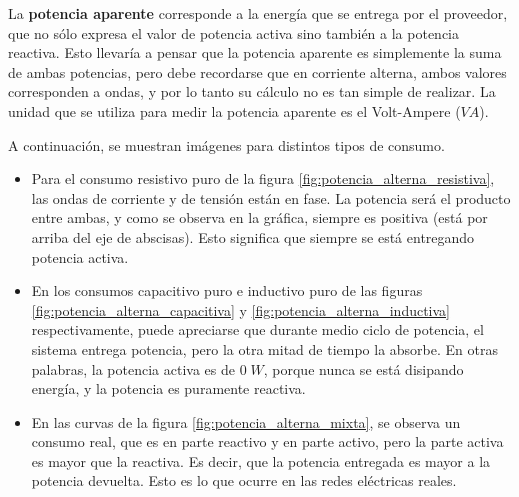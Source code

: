La \textbf{potencia aparente} corresponde a la energía que se entrega por el proveedor, que no sólo expresa el valor de potencia activa sino también a la potencia reactiva. Esto llevaría a pensar que la potencia aparente es simplemente la suma de ambas potencias, pero debe recordarse que en corriente alterna, ambos valores corresponden a ondas, y por lo tanto su cálculo no es tan simple de realizar. La unidad que se utiliza para medir la potencia aparente es el Volt-Ampere ($VA$).

A continuación, se muestran imágenes para distintos tipos de consumo.
\begin{itemize}
	\item Para el consumo resistivo puro de la figura \ref{fig:potencia_alterna_resistiva}, las ondas de corriente y de tensión están en fase. La potencia será el producto entre ambas, y como se observa en la gráfica, siempre es positiva (está por arriba del eje de abscisas). Esto significa que siempre se está entregando potencia activa.
	\item En los consumos capacitivo puro e inductivo puro de las figuras \ref{fig:potencia_alterna_capacitiva} y \ref{fig:potencia_alterna_inductiva} respectivamente, puede apreciarse que durante medio ciclo de potencia, el sistema entrega potencia, pero la otra mitad de tiempo la absorbe. En otras palabras, la potencia activa es de $0\; W$, porque nunca se está disipando energía, y la potencia es puramente reactiva.
	\item En las curvas de la figura \ref{fig:potencia_alterna_mixta}, se observa un consumo real, que es en parte reactivo y en parte activo, pero la parte activa es mayor que la reactiva. Es decir, que la potencia entregada es mayor a la potencia devuelta. Esto es lo que ocurre en las redes eléctricas reales.
\end{itemize}
